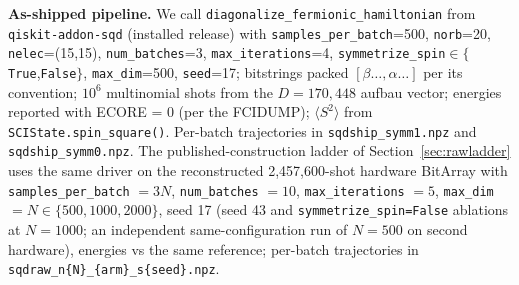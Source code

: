 \documentclass[11pt]{article}
\newcommand{\ssq}{\ensuremath{\langle S^2\rangle}}
\begin{document}
\textbf{As-shipped pipeline.} We call \texttt{diagonalize\_fermionic\_hamiltonian} from \texttt{qiskit-addon-sqd} (installed release) with \texttt{samples\_per\_batch}=500, \texttt{norb}=20, \texttt{nelec}=(15,15), \texttt{num\_batches}=3, \texttt{max\_iterations}=4, \texttt{symmetrize\_spin}$\in\{$\texttt{True},\texttt{False}$\}$, \texttt{max\_dim}=500, \texttt{seed}=17; bitstrings packed $[\beta\ldots,\alpha\ldots]$ per its convention; $10^6$ multinomial shots from the $D=170{,}448$ aufbau vector; energies reported with ECORE = 0 (per the FCIDUMP); \ssq{} from \texttt{SCIState.spin\_square()}. Per-batch trajectories in \texttt{sqdship\_symm1.npz} and \texttt{sqdship\_symm0.npz}. The published-construction ladder of Section~\ref{sec:rawladder} uses the same driver on the reconstructed 2{,}457{,}600-shot hardware BitArray with \texttt{samples\_per\_batch} $= 3N$, \texttt{num\_batches} $= 10$, \texttt{max\_iterations} $= 5$, \texttt{max\_dim} $= N \in \{500, 1000, 2000\}$, seed 17 (seed 43 and \texttt{symmetrize\_spin=False} ablations at $N=1000$; an independent same-configuration run of $N=500$ on second hardware), energies vs the same reference; per-batch trajectories in \texttt{sqdraw\_n\{N\}\_\{arm\}\_s\{seed\}.npz}.
\end{document}
